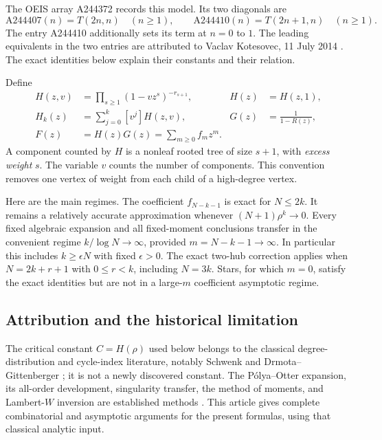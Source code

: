 \documentclass[11pt,letterpaper]{article}
\theoremstyle{definition}\newtheorem{definition}[theorem]{Definition}
\theoremstyle{remark}\newtheorem{remark}[theorem]{Remark}
\begin{document}
The OEIS array A244372 records this model. Its two diagonals are
\begin{equation}\label{hod:two:eq:oeisdef}
\mathrm{A244407}(n)=T(2n,n)\quad(n\ge1),\qquad
\mathrm{A244410}(n)=T(2n+1,n)\quad(n\ge1).
\end{equation}
The entry A244410 additionally sets its term at $n=0$ to $1$. The leading equivalents in the two entries are attributed to Vaclav Kotesovec, 11 July 2014 \cite{oeis407,oeis410,oeis372}. The exact identities below explain their constants and their relation.

Define
\begin{align}
H(z,v)&=\prod_{s\ge1}(1-vz^s)^{-r_{s+1}},& H(z)&=H(z,1),\\
H_k(z)&=\sum_{j=0}^k[v^j]H(z,v),&
G(z)&=\frac1{1-R(z)},\\
F(z)&=H(z)G(z)=\sum_{m\ge0}f_mz^m.\label{hod:two:eq:F}
\end{align}
A component counted by $H$ is a nonleaf rooted tree of size $s+1$, with \emph{excess weight} $s$. The variable $v$ counts the number of components. This convention removes one vertex of weight from each child of a high-degree vertex.

Here are the main regimes. The coefficient $f_{N-k-1}$ is exact for $N\le2k$. It remains a relatively accurate approximation whenever $(N+1)\rho^k\to0$. Every fixed algebraic expansion and all fixed-moment conclusions transfer in the convenient regime $k/\log N\to\infty$, provided $m=N-k-1\to\infty$. In particular this includes $k\ge\epsilon N$ with fixed $\epsilon>0$. The exact two-hub correction applies when $N=2k+r+1$ with $0\le r<k$, including $N=3k$. Stars, for which $m=0$, satisfy the exact identities but are not in a large-$m$ coefficient asymptotic regime.

\subsection{Attribution and the historical limitation}
The critical constant $C=H(\rho)$ used below belongs to the classical degree-distribution and cycle-index literature, notably Schwenk \cite{schwenk} and Drmota--Gittenberger \cite{dg}; it is not a newly discovered constant. The P\'olya--Otter expansion, its all-order development, singularity transfer, the method of moments, and Lambert-$W$ inversion are established methods \cite{otter,fs,genitrini,corless}. This article gives complete combinatorial and asymptotic arguments for the present formulas, using that classical analytic input.
\end{document}

